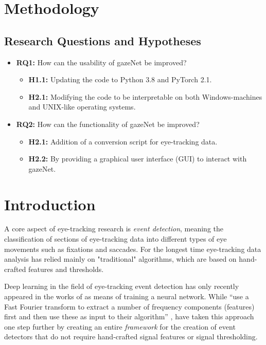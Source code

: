 \documentclass[conference]{IEEEtran}
\begin{document}
\section{Methodology}
\subsection{Research Questions and Hypotheses} 
\begin{itemize}
    \item \textbf{RQ1:} How can the usability of gazeNet be improved?
        \begin{itemize}
            \item \textbf{H1.1:} Updating the code to Python 3.8 and PyTorch 2.1.
            \item \textbf{H2.1:} Modifying the code to be interpretable on both Windows-machines and UNIX-like operating systems.
        \end{itemize}
    \item \textbf{RQ2:} How can the functionality of gazeNet be improved?
        \begin{itemize}
            \item \textbf{H2.1:} Addition of a conversion script for eye-tracking data.
            \item \textbf{H2.2:} By providing a graphical user interface (GUI) to interact with gazeNet.
        \end{itemize}
\end{itemize}

\section{Introduction}
A core aspect of eye-tracking research is \emph{event detection}, meaning the classification of sections of eye-tracking data into different types of eye movements such as fixations and saccades. For the longest time eye-tracking data analysis has relied mainly on "traditional" algorithms, which are based on hand-crafted features and thresholds. \cite{zemblys2018gazeNet} 

Deep learning in the field of eye-tracking event detection has only recently appeared in the works of \cite{Hoppe2016EndtoEndEM} as means of training a neural network. While \cite{Hoppe2016EndtoEndEM} ``use a Fast Fourier transform to extract a number of frequency components (features) first and then use these as input to their algorithm'' \cite{Hoppe2016EndtoEndEM}, \cite{zemblys2018gazeNet} have taken this approach one step further by creating an entire \emph{framework} for the creation of event detectors that do not require hand-crafted signal features or signal thresholding.
\end{document}
